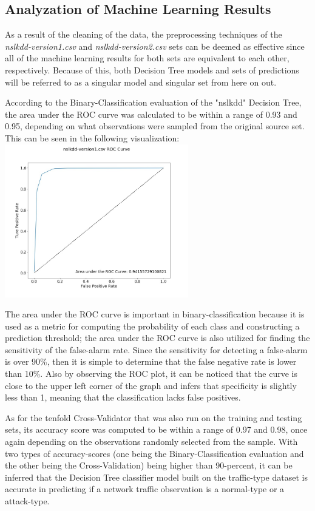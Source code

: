 \documentclass[a4paper,12pt]{IEEEtran}
\begin{document}
\subsection{Analyzation of Machine Learning Results}
As a result of the cleaning of the data, the preprocessing techniques of the \textit{nslkdd-version1.csv} and \textit{nslkdd-version2.csv} sets can be deemed as effective since all of the machine learning results for both sets are equivalent to each other, respectively. Because of this, both Decision Tree models and sets of predictions will be referred to as a singular model and singular set from here on out.

According to the Binary-Classification evaluation of the "nslkdd" Decision Tree, the area under the ROC curve was calculated to be within a range of 0.93 and 0.95, depending on what observations were sampled from the original source set. This can be seen in the following visualization:
\includegraphics[width=8cm]{v1_roc}

The area under the ROC curve is important in binary-classification because it is used as a metric for computing the probability of each class and constructing a prediction threshold; the area under the ROC curve is also utilized for finding the sensitivity of the false-alarm rate. Since the sensitivity for detecting a false-alarm is over 90\%, then it is simple to determine that the false negative rate is lower than 10\%. Also by observing the ROC plot, it can be noticed that the curve is close to the upper left corner of the graph and infers that specificity is slightly less than 1, meaning that the classification lacks false positives.

As for the tenfold Cross-Validator that was also run on the training and testing sets, its accuracy score was computed to be within a range of 0.97 and 0.98, once again depending on the observations randomly selected from the sample. With two types of accuracy-scores (one being the Binary-Classification evaluation and the other being the Cross-Validation) being higher than 90-percent, it can be inferred that the Decision Tree classifier model built on the traffic-type dataset is accurate in predicting if a network traffic observation is a normal-type or a attack-type.
\end{document}
